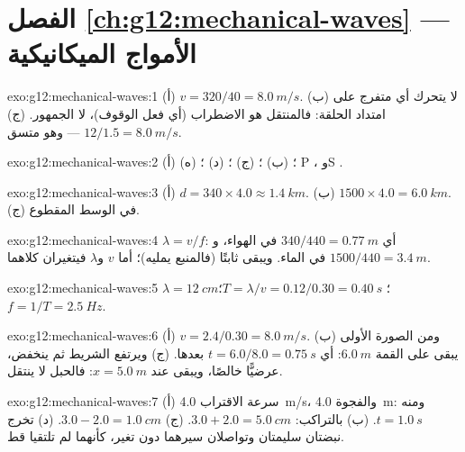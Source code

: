 \section*{الفصل \ref{ch:g12:mechanical-waves} --- الأمواج الميكانيكية}

\begin{solution}{exo:g12:mechanical-waves:1}
(أ) $v = 320/40 = \qty{8.0}{m/s}$. (ب) لا يتحرك أي متفرج على امتداد
الحلقة: فالمنتقل هو الاضطراب (أي فعل الوقوف)، لا الجمهور.
(ج) $12/1.5 = \qty{8.0}{m/s}$ --- وهو متسق.
\end{solution}

\begin{solution}{exo:g12:mechanical-waves:2}
(أ) ؛ (ب) ؛ (ج) ؛ (د) ؛
(ه) P ، وS .
\end{solution}

\begin{solution}{exo:g12:mechanical-waves:3}
(أ) $d = 340 \times 4.0 \approx \qty{1.4}{km}$.
(ب) $1500 \times 4.0 = \qty{6.0}{km}$. (ج)  في
الوسط المقطوع.
\end{solution}

\begin{solution}{exo:g12:mechanical-waves:4}
$\lambda = v/f$: أي $340/440 = \qty{0.77}{m}$ في الهواء،
و$1500/440 = \qty{3.4}{m}$ في الماء. ويبقى  ثابتًا (فالمنبع
يمليه)؛ أما $v$ و$\lambda$ فيتغيران كلاهما.
\end{solution}

\begin{solution}{exo:g12:mechanical-waves:5}
$\lambda = \qty{12}{cm}$؛ $T = \lambda/v = 0.12/0.30 = \qty{0.40}{s}$؛
$f = 1/T = \qty{2.5}{Hz}$.
\end{solution}

\begin{solution}{exo:g12:mechanical-waves:6}
(أ) $v = 2.4/0.30 = \qty{8.0}{m/s}$. (ب) ومن الصورة الأولى يبقى على
القمة $\qty{6.0}{m}$: أي $t = 6.0/8.0 = \qty{0.75}{s}$ بعدها.
(ج) ويرتفع الشريط ثم ينخفض، عرضيًّا خالصًا، ويبقى
عند $x = \qty{5.0}{m}$: فالحبل لا ينتقل.
\end{solution}

\begin{solution}{exo:g12:mechanical-waves:7}
(أ) سرعة الاقتراب \qty{4.0}{m/s}، والفجوة \qty{4.0}{m}: ومنه $t = \qty{1.0}{s}$.
(ب) بالتراكب: $3.0 + 2.0 = \qty{5.0}{cm}$.
(ج) $3.0 - 2.0 = \qty{1.0}{cm}$. (د) تخرج نبضتان سليمتان وتواصلان
سيرهما دون تغير، كأنهما لم تلتقيا قط.
\end{solution}

